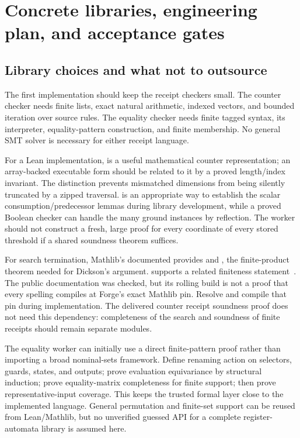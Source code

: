 \section{Concrete libraries, engineering plan, and acceptance gates}
\label{sec:plan}

\subsection{Library choices and what not to outsource}
The first implementation should keep the receipt checkers small. The counter
checker needs finite lists, exact natural arithmetic, indexed vectors, and
bounded iteration over source rules. The equality checker needs finite tagged
syntax, its interpreter, equality-pattern construction, and finite membership.
No general SMT solver is necessary for either receipt language.

For a Lean implementation,  is a useful mathematical counter
representation; an array-backed executable form should be related to it by a
proved length/index invariant. The distinction prevents mismatched dimensions
from being silently truncated by a zipped traversal.  is an
appropriate way to establish the scalar consumption/predecessor lemmas during
library development, while a proved Boolean checker can handle the many ground
instances by reflection. The worker should not construct a fresh, large
 proof for every coordinate of every stored threshold if a shared
soundness theorem suffices.

For search termination, Mathlib's documented
 provides  and
, the finite-product theorem needed for Dickson's
argument.  supports a related
finiteness statement~\cite{wqo}. The public documentation was checked, but its
rolling build is not a proof that every spelling compiles at Forge's exact
Mathlib pin. Resolve and compile that pin during implementation. The delivered
counter receipt soundness proof does not need this dependency: completeness of
the search and soundness of finite receipts should remain separate modules.

The equality worker can initially use a direct finite-pattern proof rather
than importing a broad nominal-sets framework. Define renaming action on
selectors, guards, states, and outputs; prove evaluation equivariance by
structural induction; prove equality-matrix completeness for finite support;
then prove representative-input coverage. This keeps the trusted formal layer
close to the implemented language. General permutation and finite-set support
can be reused from Lean/Mathlib, but no unverified guessed API for a complete
register-automata library is assumed here.

